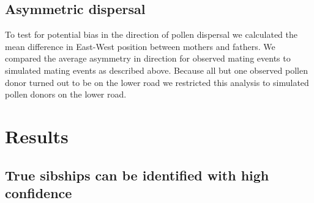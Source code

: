 \documentclass[10pt, a4paper, twocolumn]{article} %
\begin{document}
\subsection{Asymmetric dispersal}

To test for potential bias in the direction of pollen dispersal we calculated the mean difference in East-West position between mothers and fathers.
We compared the average asymmetry in direction for observed mating events to simulated mating events as described above.
Because all but one observed pollen donor turned out to be on the lower road we restricted this analysis to simulated pollen donors on the lower road.

\section{Results}

\subsection{True sibships can be identified with high confidence}
\end{document}
